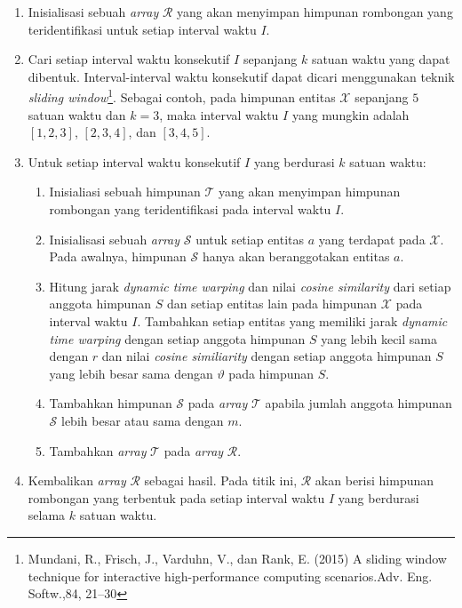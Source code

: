 \documentclass[a4paper,twoside]{article}
\begin{document}
\begin{enumerate}
    \item Inisialisasi sebuah \textit{array} $\mathcal{R}$ yang akan menyimpan himpunan rombongan yang teridentifikasi untuk setiap interval waktu $I$.
    \item Cari setiap interval waktu konsekutif $I$ sepanjang $k$ satuan waktu yang dapat dibentuk. Interval-interval waktu konsekutif dapat dicari menggunakan teknik \textit{sliding window}\footnote{Mundani, R., Frisch, J., Varduhn, V., dan Rank, E. (2015) A sliding window technique for interactive high-performance computing scenarios.Adv. Eng. Softw.,84, 21–30}. Sebagai contoh, pada himpunan entitas $\mathcal{X}$ sepanjang $5$ satuan waktu dan $k = 3$, maka interval waktu $I$ yang mungkin adalah $[1, 2, 3]$, $[2, 3, 4]$, dan $[3, 4, 5]$.
    \item Untuk setiap interval waktu konsekutif $I$ yang berdurasi $k$ satuan waktu:
    
    \begin{enumerate}
        \item Inisialiasi sebuah himpunan $\mathcal{T}$ yang akan menyimpan himpunan rombongan yang teridentifikasi pada interval waktu $I$.  
        \item Inisialisasi sebuah \textit{array} $\mathcal{S}$ untuk setiap entitas $a$ yang terdapat pada $\mathcal{X}$. Pada awalnya, himpunan $\mathcal{S}$ hanya akan beranggotakan entitas $a$.
        \item Hitung jarak \textit{dynamic time warping} dan nilai \textit{cosine similarity} dari setiap anggota himpunan $S$ dan setiap entitas lain pada himpunan $\mathcal{X}$ pada interval waktu $I$. Tambahkan setiap entitas yang memiliki jarak \textit{dynamic time warping} dengan setiap anggota himpunan $S$ yang lebih kecil sama dengan $r$ dan nilai \textit{cosine similiarity} dengan setiap anggota himpunan $S$ yang lebih besar sama dengan $\vartheta$ pada himpunan $S$.
        \item Tambahkan himpunan $\mathcal{S}$ pada \textit{array} $\mathcal{T}$ apabila jumlah anggota himpunan $\mathcal{S}$ lebih besar atau sama dengan $m$.
        \item Tambahkan \textit{array} $\mathcal{T}$ pada \textit{array} $\mathcal{R}$.
    \end{enumerate}
    \item Kembalikan \textit{array} $\mathcal{R}$ sebagai hasil. Pada titik ini, $\mathcal{R}$ akan berisi himpunan rombongan yang terbentuk pada setiap interval waktu $I$ yang berdurasi selama $k$ satuan waktu.
\end{enumerate}
\end{document}
